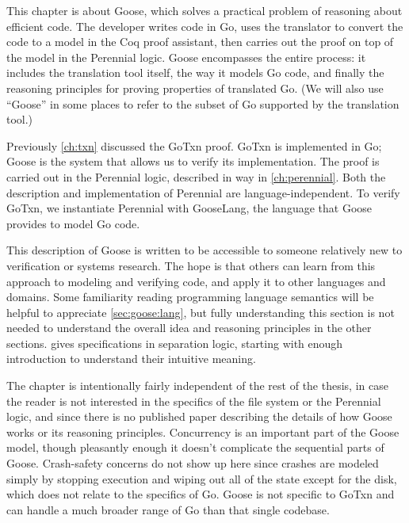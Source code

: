 This chapter is about Goose, which solves a practical
problem of reasoning about efficient code. The developer writes
code in Go, uses the  translator to convert the code to a model in the Coq proof
assistant, then carries out the proof on top of the model in the Perennial
logic. Goose encompasses
the entire process: it includes the translation tool itself, the way it models Go
code, and finally the reasoning principles for proving properties of translated
Go. (We will also use ``Goose'' in some places to refer to the subset of Go
supported by the translation tool.)

Previously \cref{ch:txn} discussed the GoTxn proof. GoTxn is implemented in Go;
Goose is the system that allows us to verify its implementation. The proof is
carried out in the Perennial logic, described in way in \cref{ch:perennial}.
Both the description and implementation of Perennial are language-independent.
To verify GoTxn, we instantiate Perennial with GooseLang, the language that
Goose provides to model Go code.

This description of Goose is written to be accessible to someone relatively new
to verification or systems research. The hope is that others can learn from this
approach to modeling and verifying code, and apply it to other languages and
domains. Some familiarity reading programming language semantics will be helpful
to appreciate \cref{sec:goose:lang}, but fully understanding this section is not
needed to understand the overall idea and reasoning principles in the other
sections.  gives specifications in separation logic,
starting with enough introduction to understand their intuitive meaning.

The chapter is intentionally fairly independent of the rest of the thesis, in
case the reader is not interested in the specifics of the file system or the
Perennial logic, and since there is no published paper describing the details of
how Goose works or its reasoning principles. Concurrency is an important part of
the Goose model, though pleasantly enough it doesn't complicate the sequential
parts of Goose. Crash-safety concerns do not show up here since crashes are
modeled simply by stopping execution and wiping out all of the state except for
the disk, which does not relate to the specifics of Go. Goose is not specific to
GoTxn and can handle a much broader range of Go than that single codebase.








